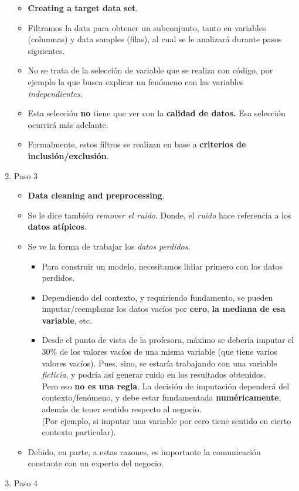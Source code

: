 \documentclass[
]{book}
\providecommand{\tightlist}{%
  \setlength{\itemsep}{0pt}\setlength{\parskip}{0pt}}
\begin{document}
\begin{enumerate}
  \begin{itemize}
  \tightlist
  \item
    \textbf{Creating a target data set}.
  \item
    Filtramos la data para obtener un
    subconjunto, tanto en variables (columnas)
    y data samples (filas), al cual se le
    analizará durante pasos siguientes.
  \item
    No se trata de la selección de variable
    que se realiza con código, por ejemplo la
    que busca explicar un fenómeno con las
    variables \emph{independientes}.
  \item
    Esta selección \textbf{no} tiene que ver con
    la \textbf{calidad de datos.} Esa selección
    ocurrirá más adelante.
  \item
    Formalmente, estos filtros se realizan en base a
    \textbf{criterios de inclusión/exclusión}.
  \end{itemize}
\item
  Paso 3

  \begin{itemize}
  \tightlist
  \item
    \textbf{Data cleaning and preprocessing}.
  \item
    Se le dice también \emph{remover el ruido}.
    Donde, el \emph{ruido} hace referencia a los
    \textbf{datos atípicos}.
  \item
    Se ve la forma de trabajar los \emph{datos perdidos}.

    \begin{itemize}
    \tightlist
    \item
      Para construir un modelo, necesitamos lidiar
      primero con los datos perdidos.
    \item
      Dependiendo del contexto, y requiriendo
      fundamento, se pueden imputar/reemplazar los datos
      vacíos por \textbf{cero}, \textbf{la mediana de esa variable},
      etc.
    \item
      Desde el punto de vista de la profesora, máximo
      se debería imputar el 30\% de los valores vacíos de
      una misma variable (que tiene varios valores vacíos).
      Pues, sino, se estaría trabajando con una variable
      \emph{ficticia}, y podría así generar ruido en los
      resultados obtenidos.\\
      Pero eso \textbf{no es una regla}. La decisión de
      imputación dependerá del contexto/fenómeno, y
      debe estar fundamentada \textbf{numéricamente},
      además de tener sentido respecto al negocio.\\
      (Por ejemplo, si imputar una variable por cero
      tiene sentido en cierto contexto particular).
    \end{itemize}
  \item
    Debido, en parte, a estas razones, es importante
    la comunicación constante con un experto del negocio.
  \end{itemize}
\item
  Paso 4


\end{enumerate}
\end{document}
